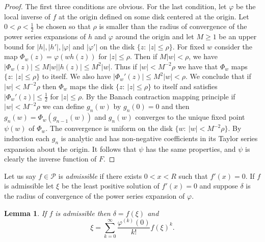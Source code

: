 \documentclass[12pt]{amsart}
\newtheorem{lemma}[thm]{Lemma}
\begin{document}
\begin{proof} The first three conditions are obvious.   For the last condition,
let $\varphi$ be the local inverse of $f$ at the origin defined on
some disk centered at the origin.  Let $0<\rho<\frac12$ be chosen
so that $\rho$ is smaller than the radius of convergence of the
power series expansions of $h$ and $\varphi$ around the origin and
let $M\ge 1$ be an upper bound for $|h|,|h'|,|\varphi|$ and
$|\varphi'|$ on the disk $ \{z:\ |z|\le \rho\}$.   For fixed $w$
consider the map $\Phi_w(z)= \varphi(wh(z))$ for $|z|\le \rho$.
Then if $M|w|<\rho$, we have $|\Phi_w(z)|\le M|w||h(z)|\le
M^2|w|$.  Thus if $|w|<M^{-2}\rho$ we have that $\Phi_w$ maps
$\{z:\ |z|\le \rho\}$ to itself. We also have $ |\Phi_w'(z)|\le
M^2|w|<\rho$. We conclude that if $|w|<M^{-2}\rho$ then $\Phi_w$
maps the disk $\{z:\ |z|\le \rho\}$ to itself and satisfies
$|\Phi_w'(z)|\le \frac12$ for $|z|\le \rho$. By the Banach
contraction mapping principle if $|w|<M^{-2}\rho$ we can define
$g_n(w)$ by $g_n(0)=0$ and then $g_n(w)=\Phi_w(g_{n-1}(w))$ and
$g_n(w)$ converges to the unique fixed point $\psi(w)$ of
$\Phi_w$. The convergence is uniform on the disk $\{w:\
|w|<M^{-2}\rho\}$.  By induction each $g_n$ is analytic and has
non-negative coefficients in its Taylor series expansion about the
origin.  It follows that $\psi$ has the same properties, and
$\psi$ is clearly the inverse function of $F$.\end{proof}






Let us say $f\in\mathcal P$ is {\it admissible} if there exists
$0<x<R$ such that $f'(x)=0$. If $f$ is admissible let $\xi$ be the
least positive solution of $f'(x)=0$ and suppose $\delta$ is the
radius of convergence of the power series expansion of $\varphi$.

\begin{lemma}\label{admissible} If $f$ is admissible then
$\delta=f(\xi)$ and $$\xi=
\sum_{k=0}^{\infty}\frac{\varphi^{(k)}(0)}{k!}f(\xi)^k.$$
\end{lemma}
\end{document}
